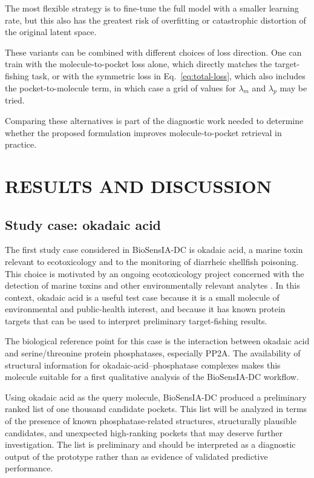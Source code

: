 \documentclass[12pt,fleqn]{article}
\begin{document}
The most flexible strategy is to fine-tune the full model with a
smaller learning rate, but this also has the greatest risk of
overfitting or catastrophic distortion of the original latent space.

These variants can be combined with different choices of loss
direction. One can train with the molecule-to-pocket loss alone, which
directly matches the target-fishing task, or with the symmetric loss in
Eq.~\eqref{eq:total-loss}, which also includes the pocket-to-molecule
term, in which case a grid of values for $\lambda_m$ and $\lambda_p$
may be tried.

Comparing these alternatives is part of the diagnostic work
needed to determine whether the proposed formulation improves
molecule-to-pocket retrieval in practice.

\section{RESULTS AND DISCUSSION}

\subsection{Study case: okadaic acid}
\label{sec:study-case-oka}

The first study case considered in BioSensIA-DC is okadaic acid, a
marine toxin relevant to ecotoxicology and to the monitoring of
diarrheic shellfish poisoning. This choice is motivated by an ongoing
ecotoxicology project concerned with the detection of marine toxins
and other environmentally relevant analytes
\citep{souza25:_first_recor_diarr_shell_poison}. In this context,
okadaic acid is a useful test case because it is a small molecule of
environmental and public-health interest, and because it has known
protein targets that can be used to interpret preliminary
target-fishing results.

The biological reference point for this case is the interaction
between okadaic acid and serine/threonine protein phosphatases,
especially PP2A. The availability of structural information for
okadaic-acid--phosphatase complexes makes this molecule suitable for a
first qualitative analysis of the BioSensIA-DC workflow. 

Using okadaic acid as the query molecule, BioSensIA-DC produced a
preliminary ranked list of one thousand candidate pockets. This list
will be analyzed in terms of the presence of known phosphatase-related
structures, structurally plausible candidates, and unexpected
high-ranking pockets that may deserve further investigation. The list
is preliminary and should be interpreted as a diagnostic output of the
prototype rather than as evidence of validated predictive performance.
\end{document}
